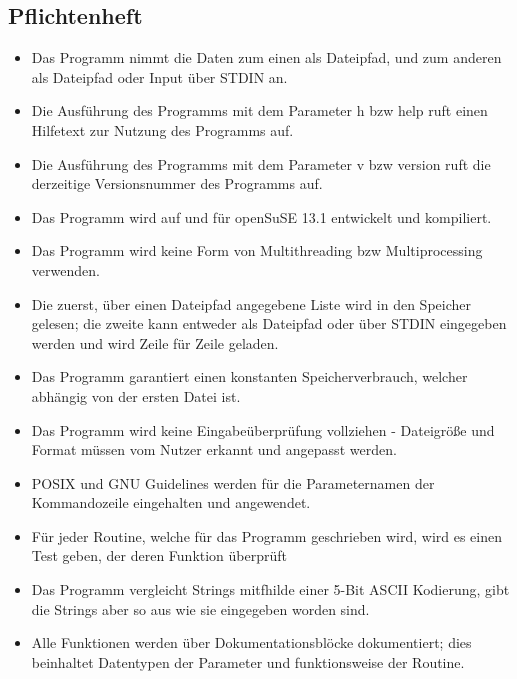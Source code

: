 \subsection{Pflichtenheft}
\label{auszug:pflichtenheft}
\begin{itemize}

    \item Das Programm nimmt die Daten zum einen als Dateipfad, und zum anderen als Dateipfad oder Input über STDIN an.

    \item Die Ausführung des Programms mit dem Parameter \-h bzw \-\-help ruft einen Hilfetext zur Nutzung des Programms auf.

    \item Die Ausführung des Programms mit dem Parameter \-v bzw \-\-version ruft die derzeitige Versionsnummer des Programms auf.

    \item Das Programm wird auf und für openSuSE 13.1 entwickelt und kompiliert.

    \item Das Programm wird keine Form von Multithreading bzw Multiprocessing verwenden.

    \item Die zuerst, über einen Dateipfad angegebene Liste wird in den Speicher gelesen;
    die zweite kann entweder als Dateipfad oder über STDIN eingegeben werden und wird Zeile für Zeile geladen.

    \item Das Programm garantiert einen konstanten Speicherverbrauch, welcher abhängig von der ersten Datei ist.

    \item Das Programm wird keine Eingabeüberprüfung vollziehen - Dateigröße und Format müssen vom Nutzer erkannt und angepasst werden.

    \item POSIX und GNU Guidelines werden für die Parameternamen der Kommandozeile eingehalten und angewendet.

    \item Für jeder Routine, welche für das Programm geschrieben wird, wird es einen Test geben, der deren Funktion überprüft

    \item Das Programm vergleicht Strings mitfhilde einer 5-Bit ASCII Kodierung, gibt die Strings aber so aus wie sie eingegeben worden sind.

    \item Alle Funktionen werden über Dokumentationsblöcke dokumentiert; dies beinhaltet Datentypen der Parameter und funktionsweise der Routine.

\end{itemize}
\clearpage

